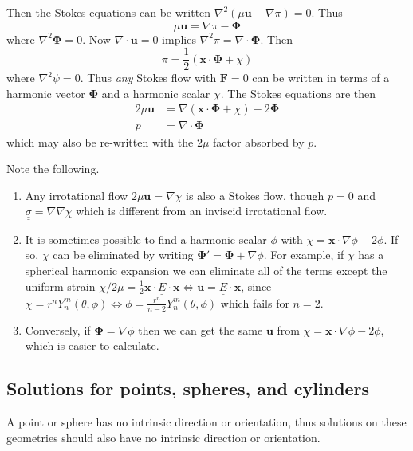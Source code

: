 \documentclass{jknotes}
\newcommand{\dunder}[1]{\underline{\underline{#1}}}
\begin{document}
Then the Stokes equations can be written $\nabla^2 \left( \mu \bm{u} - \nabla
\pi\right) = 0$. Thus
\begin{equation}
	\mu \bm{u} = \nabla \pi - \bm{\Phi}
\end{equation}
where $\nabla^2 \bm{\Phi} = 0$. Now $\nabla \cdot \bm{u} = 0$ implies
$\nabla^2 \pi = \nabla \cdot \bm{\Phi}$. Then
\begin{equation}
	\pi = \frac{1}{2}\left(\bm{x}\cdot\bm{\Phi} + \chi\right)
\end{equation}
where $\nabla^2 \psi = 0$. Thus \emph{any} Stokes flow with $\bm{F} = 0$ can
be written in terms of a harmonic vector $\bm{\Phi}$ and a harmonic scalar
$\chi$. The Stokes equations are then
\begin{equation}
	\begin{aligned}
		2\mu \bm{u} &= \nabla \left(\bm{x} \cdot \bm{\Phi} + \chi\right) -
	2\bm{\Phi} \\
	p &= \nabla \cdot \bm{\Phi}
\end{aligned}
\end{equation}
which may also be re-written with the $2\mu$ factor absorbed by $p$.

Note the following.
\begin{enumerate}
	\item Any irrotational flow $2 \mu \bm{u} = \nabla \chi$ is also a Stokes
		flow, though $p = 0$ and $\dunder{\sigma} = \nabla \nabla \chi$ which
		is different from an inviscid irrotational flow.
	\item It is sometimes possible to find a harmonic scalar $\phi$ with
		$\chi = \bm{x} \cdot \nabla \phi - 2 \phi$. If so, $\chi$ can be
		eliminated by writing $\bm{\Phi}' = \bm{\Phi} + \nabla \phi$. For
		example, if $\chi$ has a spherical harmonic expansion we can eliminate
		all of the terms except the uniform strain $\chi/2\mu = \frac{1}{2}
		\bm{x} \cdot \dunder{E} \cdot \bm{x} \iff \bm{u} = \dunder{E} \cdot
		\bm{x}$, since $\chi = r^n Y_n^m(\theta,\phi) \iff \phi =
		\frac{r^n}{n-2} Y_n^m(\theta,\phi)$ which fails for $n=2$.
	\item Conversely, if $\bm{\Phi} = \nabla \phi$ then we can get the same
		$\bm{u}$ from $\chi = \bm{x} \cdot \nabla \phi - 2\phi$, which is
		easier to calculate.
\end{enumerate}

\subsection{Solutions for points, spheres, and cylinders}
A point or sphere has no intrinsic direction or orientation, thus solutions on
these geometries should also have no intrinsic direction or orientation.
\end{document}

